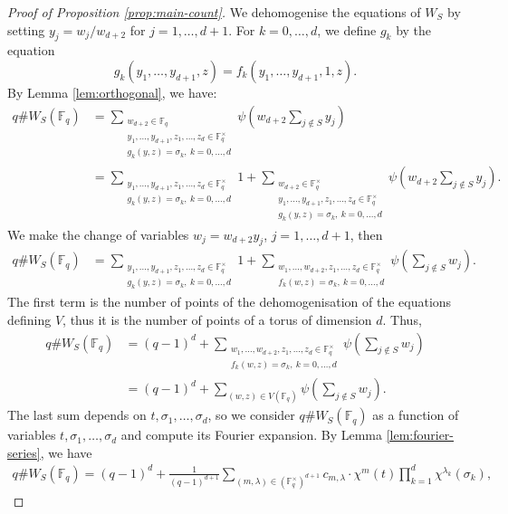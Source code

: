 \documentclass[11pt, reqno]{amsart}
\theoremstyle{plain}
\theoremstyle{definition}
\newcommand{\F}{\mathbb{F}}
\begin{document}
\begin{proof}[Proof of Proposition \ref{prop:main-count}]
We dehomogenise the equations of $W_S$ by setting $y_j = w_{j}/w_{d+2}$ for $j=1,\dots,d+1$. For $k=0,\dots,d$, we define $g_k$ by the equation
\[
g_k(y_1,\dots,y_{d+1},z)= f_k(y_1,\dots,y_{d+1},1,z).
\]
By Lemma \ref{lem:orthogonal}, we have:
\begin{align*}
     q  \# W_{S} (\mathbb{F}_q)  &= \sum_{
     \substack{w_{d+2}\in \F_q \\ y_1,\dots,y_{d+1},z_1,\dots,z_d \in \F_q^{\times} \\ g_k(y,z)=\sigma_k, \ k=0,\dots,d }} \psi\left(w_{d+2}\sum_{j \notin S} y_j\right) \\
     &= \sum_{
     \substack{y_1,\dots,y_{d+1},z_1,\dots,z_d \in \F_q^{\times} \\ g_k(y,z)=\sigma_k, \ k=0,\dots,d}} 1 + \sum_{
     \substack{w_{d+2}\in \F_q^\times \\ y_1,\dots,y_{d+1},z_1,\dots,z_d \in \F_q^\times \\g_k(y,z)=\sigma_k, \ k=0,\dots,d}} \psi\left(w_{d+2}\sum_{j \notin S} y_j\right).
\end{align*}
We make the change of variables $w_j = w_{d+2}y_j$,  $j=1,\dots, d+1$, then
\begin{align*}
      q  \# W_{S} (\mathbb{F}_q)  &= \sum_{
     \substack{y_1,\dots,y_{d+1},z_1,\dots,z_d \in \F_q^{\times} \\ g_k(y,z)=\sigma_k, \ k=0,\dots,d}} 1 + \sum_{
     \substack{w_1,\dots, w_{d+2}, z_1, \dots, z_d \in \F_q^\times \\f_k(w,z)=\sigma_k, \ k=0,\dots,d}} \psi\left(\sum_{j\notin S} w_j\right)\!.
\end{align*}
The first term is the number of points of the dehomogenisation of the equations defining $V$, thus it is the number of points of a torus of dimension $d$. Thus, 
\begin{align*}
       q  \# W_{S} (\mathbb{F}_q)  &= (q-1)^{d} + \sum_{
     \substack{w_1,\dots, w_{d+2}, z_1, \dots, z_d \in \F_q^\times \\f_k(w,z)=\sigma_k, \ k=0,\dots,d}} \psi\left(\sum_{j\notin S} w_j\right)\!\\
    &= (q-1)^{d} + \sum_{(w,z) \in V(\F_q) } \psi\left(\sum_{j \notin S} w_j\right).
    \end{align*}
The last sum depends on $t, \sigma_1,\dots, \sigma_d$, so we consider $q \# W_{S}(\F_q)$ as a function of variables $t, \sigma_1,\dots, \sigma_d$ and compute its Fourier expansion.
By Lemma \ref{lem:fourier-series}, we have 
\begin{align*}
 q \# W_{S}(\F_q) = (q-1)^{d} + \frac{1}{ (q-1)^{d+1}}\sum_{(m,\lambda) \in \left(\F_q^{\times}\right)^{d+1}} c_{m,\lambda} \cdot   \chi^{m}(t) \prod_{k=1}^d \chi^{\lambda_k} (\sigma_k),

\end{align*}
\end{proof}
\end{document}
